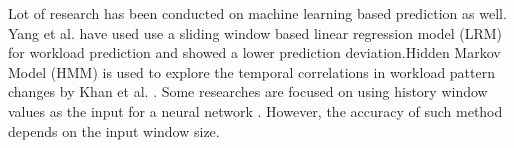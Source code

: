 Lot of research has been conducted on machine learning based prediction as well. Yang et al. \cite{Yang_2013} have used use a sliding window based linear regression model (LRM) for workload prediction and showed a lower prediction deviation.Hidden Markov Model (HMM) is used to explore the temporal correlations in workload pattern changes by Khan et al. \cite{Khan_2012}. Some  researches are focused on using history window values as the input for a neural network \cite{Islam_2012}. However, the accuracy of such method depends on the input window size.\\